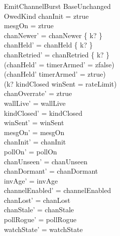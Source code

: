 \documentclass[a4paper,10pt,fleqn]{article}
\begin{document}
\begin{schema}{EmitChannelBurst}
  BaseUnchanged \\
  OwedKind
  \where
  chanInit = ztrue \\
  mesgOn = ztrue \\
  chanNewer' = chanNewer \setminus \{ k? \} \\
  chanHeld' = chanHeld \setminus \{ k? \} \\
  chanRetried' = chanRetried \setminus \{ k? \} \\
  (chanHeld' = \emptyset \implies timerArmed' = zfalse) \\
  (chanHeld' \neq \emptyset \implies timerArmed' = ztrue) \\
  (k? \in kindClosed \lor winSent = rateLimit) \\
  chanOverrate' = ztrue \\
  wallLive' = wallLive \\
  kindClosed' = kindClosed \\
  winSent' = winSent \\
  mesgOn' = mesgOn \\
  chanInit' = chanInit \\
  pollOn' = pollOn \\
  chanUnseen' = chanUnseen \\
  chanDormant' = chanDormant \\
  invAge' = invAge \\
  channelEnabled' = channelEnabled \\
  chanLost' = chanLost \\
  chanStale' = chanStale \\
  pollRogue' = pollRogue \\
  watchState' = watchState
\end{schema}
\end{document}
